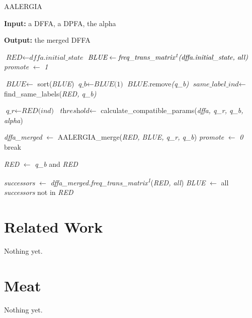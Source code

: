\documentclass[
a4paper,     %
12pt         %
]{scrartcl}  %
\begin{document}
\begin{algorithm}[H]
\caption{AALERGIA}\label{alg:aalergia}
\begin{algorithmic}[1]
\item \textbf{Input:}  a DFFA, a DPFA, the alpha
\item \textbf{Output:} the merged DFFA

\State $\textit{RED} \gets \textit{dffa.initial\_state}$ \label{aalergia:redstart}
\State $\textit{BLUE} \gets \textit{freq\_trans\_matrix\textsuperscript{1}(dffa.initial\_state, all)}$ \label{aalergia:bluestart}
\State \textit{promote} $\gets$ \textit{1}

 
 \State $\textit{BLUE} \gets$ sort(\textit{BLUE})
 \State $\textit{q\_b} \gets \textit{BLUE(1)}$
 \State $\textit{BLUE}$.remove\textit{(q\_b)}
 \State $\textit{same\_label\_ind} \gets $find\_same\_labels(\textit{RED, q\_b)}
 
        \State $\textit{q\_r} \gets \textit{RED(ind)}$
        \State $\textit{threshold} \gets$ calculate\_compatible\_params(\textit{dffa, q\_r, q\_b, alpha})
        
         \label{aalergia:criterion}
          \State \textit{dffa\_merged} $\gets$ AALERGIA\_merge(\textit{RED, BLUE, q\_r, q\_b})
          \State \textit{promote} $\gets$ \textit{0}
          \State break
        \EndIf 
\EndFor

          \State \textit{RED} $\gets$ \textit{q\_b} and \textit{RED} \label{aalergia:promote}
        \EndIf 
 
    \State \textit{successors} $\gets$ \textit{dffa\_merged.freq\_trans\_matrix\textsuperscript{1}}(\textit{RED, all})
    \State \textit{BLUE} $\gets$ all \textit{successors} not in \textit{RED} \label{aalergia:excludeblue}
  \EndWhile
\end{algorithmic}
\end{algorithm}

\newpage
\section{Related Work}
Nothing yet.


\newpage
\section{Meat}
Nothing yet.
\end{document}
